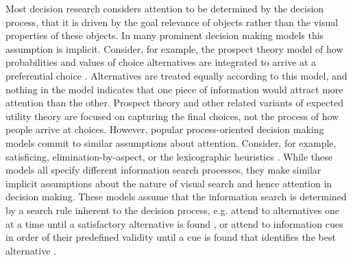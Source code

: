 \documentclass[english,natbib,man,floatsintext]{apa6}
\begin{document}
Most decision research considers attention to be determined by the decision process, that it is driven by the goal relevance of objects rather than the visual properties of these objects. In many prominent decision making models this assumption is implicit. Consider, for example, the prospect theory model of how probabilities and values of choice alternatives are integrated to arrive at a preferential choice \citep{tversky1979}. Alternatives are treated equally according to this model, and nothing in the model indicates that one piece of information would attract more attention than the other. Prospect theory and other related variants of expected utility theory are focused on capturing the final choices, not the process of how people arrive at choices. However, popular process-oriented decision making models commit to similar assumptions about attention. Consider, for example, satisficing, elimination-by-aspect, or the lexicographic heuristics \citep{payne1988, simon1956a}. While these models all specify different information search processes, they make similar implicit assumptions about the nature of visual search and hence attention in decision making. These  models assume that the information search is determined by a search rule inherent to the decision process, e.g. attend to alternatives one at a time until a satisfactory alternative is found \citep{stuttgen2012}, or attend to information cues in order of their predefined validity until a cue is found that identifies the best alternative \citep{krefeld-schwalb2019a}.\\ 
\end{document}
